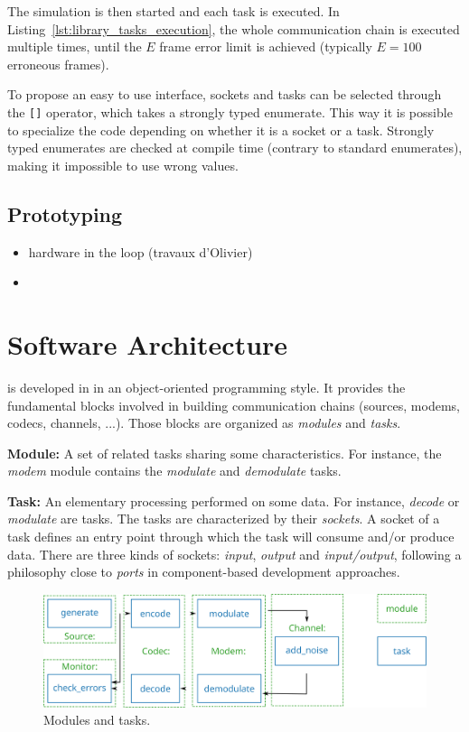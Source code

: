 The simulation is then started and each task is executed. In
Listing~\ref{lst:library_tasks_execution}, the whole communication chain is
executed multiple times, until the $E$ frame error limit is achieved (typically
$E = 100$ erroneous frames).

To propose an easy to use interface, sockets and tasks can be selected through
the \verb|[]| operator, which takes a \Cxx strongly typed enumerate. This way it
is possible to specialize the code depending on whether it is a socket or a
task. Strongly typed enumerates are checked at compile time (contrary to
standard enumerates), making it impossible to use wrong values.

\subsection{Prototyping}

\begin{itemize}
  \item hardware in the loop (travaux d'Olivier)
  \item \cite{Cassagne2017,Cassagne2017a}
\end{itemize}

\section{Software Architecture}
\label{sec:soft_archi}

\AFFECT is developed in \Cxx in an object-oriented programming style. It
provides the fundamental blocks involved in building communication chains
(sources, modems, codecs, channels, ...). Those blocks are organized as
\textit{modules} and \textit{tasks}.

\textbf{Module:} A set of related tasks sharing some characteristics. For
instance, the \textit{modem} module contains the \textit{modulate} and
\textit{demodulate} tasks.

\textbf{Task:} An elementary processing performed on some data. For instance,
\textit{decode} or \textit{modulate} are tasks. The tasks are characterized by
their \textit{sockets}. A socket of a task defines an entry point through which
the task will consume and/or produce data. There are three kinds of sockets:
\textit{input}, \textit{output} and \textit{input/output}, following a
philosophy close to \emph{ports} in component-based development approaches.

\begin{figure}[htp]
  \centering
  \includegraphics[width=0.70\linewidth]{soft_archi/com_chain_task_module}
  \caption{Modules and tasks.}
  \label{fig:soft_archi_com_chain_task_module}
\end{figure}

